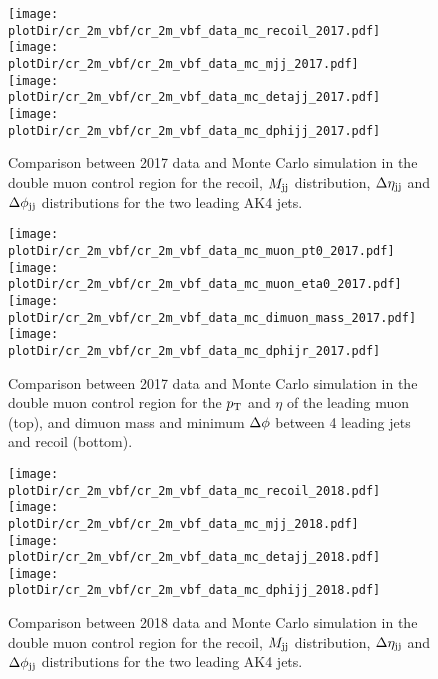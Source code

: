\begin{figure}[htbp]
    \begin{center}
        \texttt{[image: \\plotDir/cr\_2m\_vbf/cr\_2m\_vbf\_data\_mc\_recoil\_2017.pdf]}
        \texttt{[image: \\plotDir/cr\_2m\_vbf/cr\_2m\_vbf\_data\_mc\_mjj\_2017.pdf]} \\
        \texttt{[image: \\plotDir/cr\_2m\_vbf/cr\_2m\_vbf\_data\_mc\_detajj\_2017.pdf]}
        \texttt{[image: \\plotDir/cr\_2m\_vbf/cr\_2m\_vbf\_data\_mc\_dphijj\_2017.pdf]}
    \end{center}
    \caption{Comparison between 2017 data and Monte Carlo simulation in the double muon control region for
        the recoil, $M_{\textrm{jj}}$ distribution, $\Delta \eta_{\textrm{jj}}$ and $\Delta \phi_{\textrm{jj}}$ distributions for the two leading AK4 jets.}
    \label{fig:cr_2m_vbf_2017_mtr}
\end{figure}

\begin{figure}[htbp]
    \begin{center}
        \texttt{[image: \\plotDir/cr\_2m\_vbf/cr\_2m\_vbf\_data\_mc\_muon\_pt0\_2017.pdf]}
        \texttt{[image: \\plotDir/cr\_2m\_vbf/cr\_2m\_vbf\_data\_mc\_muon\_eta0\_2017.pdf]}
        \texttt{[image: \\plotDir/cr\_2m\_vbf/cr\_2m\_vbf\_data\_mc\_dimuon\_mass\_2017.pdf]}
        \texttt{[image: \\plotDir/cr\_2m\_vbf/cr\_2m\_vbf\_data\_mc\_dphijr\_2017.pdf]}
    \end{center}
    \caption{Comparison between 2017 data and Monte Carlo simulation in the double muon control region for
        the $p_{\textrm{T}}$ and $\eta$ of the leading muon (top), and dimuon mass and minimum $\Delta \phi$ between 4 leading jets and recoil (bottom).}
    \label{fig:cr_2m_vbf_2017_mtr_2}
\end{figure}

\begin{figure}[htbp]
    \begin{center}
        \texttt{[image: \\plotDir/cr\_2m\_vbf/cr\_2m\_vbf\_data\_mc\_recoil\_2018.pdf]}
        \texttt{[image: \\plotDir/cr\_2m\_vbf/cr\_2m\_vbf\_data\_mc\_mjj\_2018.pdf]} \\
        \texttt{[image: \\plotDir/cr\_2m\_vbf/cr\_2m\_vbf\_data\_mc\_detajj\_2018.pdf]}
        \texttt{[image: \\plotDir/cr\_2m\_vbf/cr\_2m\_vbf\_data\_mc\_dphijj\_2018.pdf]}
    \end{center}
    \caption{Comparison between 2018 data and Monte Carlo simulation in the double muon control region for
        the recoil, $M_{\textrm{jj}}$ distribution, $\Delta \eta_{\textrm{jj}}$ and $\Delta \phi_{\textrm{jj}}$ distributions for the two leading AK4 jets.}
    \label{fig:cr_2m_vbf_2018_mtr}
\end{figure}

